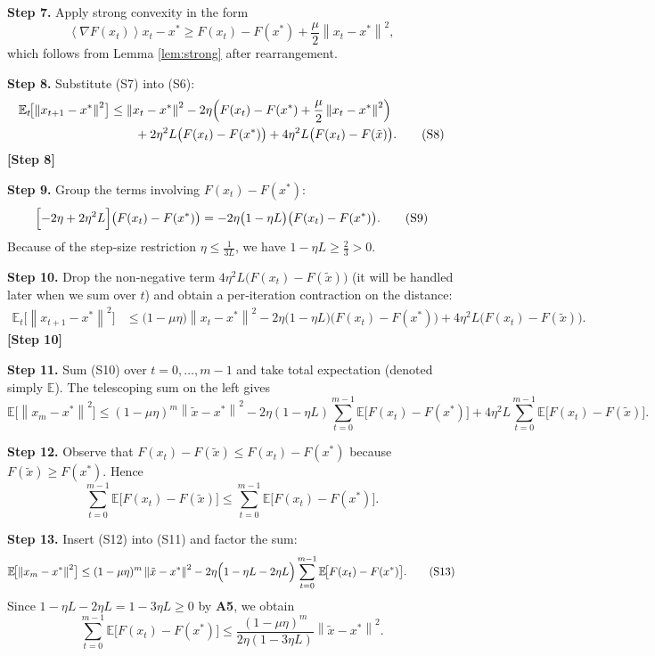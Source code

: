 \documentclass{article}
\newcommand{\E}{\mathbb{E}}
\newcommand{\norm}[1]{\left\|#1\right\|}
\newcommand{\inner}[1]{\left\langle #1 \right\rangle}
\begin{document}
\noindent\textbf{Step 7.} Apply strong convexity in the form
\[
\inner{\nabla F(x_t)}{x_t-x^{*}} \ge F(x_t)-F(x^{*})+\frac{\mu}{2}\norm{x_t-x^{*}}^{2},
\tag{S7}
\]
which follows from Lemma \ref{lem:strong} after rearrangement.

\noindent\textbf{Step 8.} Substitute (S7) into (S6):
\begin{align}
\E_t\!\bigl[\norm{x_{t+1}-x^{*}}^{2}\bigr]
&\le \norm{x_t-x^{*}}^{2}
   -2\eta\Bigl(F(x_t)-F(x^{*})+\frac{\mu}{2}\norm{x_t-x^{*}}^{2}\Bigr) \nonumber\\
&\qquad+2\eta^{2}L\bigl(F(x_t)-F(x^{*})\bigr)
   +4\eta^{2}L\bigl(F(x_t)-F(\tilde{x})\bigr).
\tag{S8}
\end{align}
\textbf{[Step 8]}

\noindent\textbf{Step 9.} Group the terms involving $F(x_t)-F(x^{*})$:
\[
\Bigl[-2\eta+2\eta^{2}L\Bigr]\bigl(F(x_t)-F(x^{*})\bigr)
= -2\eta\bigl(1-\eta L\bigr)\bigl(F(x_t)-F(x^{*})\bigr).
\tag{S9}
\]
Because of the step‑size restriction $\eta\le\frac{1}{3L}$, we have $1-\eta L\ge\frac{2}{3}>0$.

\noindent\textbf{Step 10.} Drop the non‑negative term $4\eta^{2}L\bigl(F(x_t)-F(\tilde{x})\bigr)$ (it will be handled later when we sum over $t$) and obtain a per‑iteration contraction on the distance:
\begin{align}
\E_t\!\bigl[\norm{x_{t+1}-x^{*}}^{2}\bigr]
&\le \bigl(1-\mu\eta\bigr)\norm{x_t-x^{*}}^{2}
   -2\eta\bigl(1-\eta L\bigr)\bigl(F(x_t)-F(x^{*})\bigr)
   +4\eta^{2}L\bigl(F(x_t)-F(\tilde{x})\bigr).
\tag{S10}
\end{align}
\textbf{[Step 10]}

\noindent\textbf{Step 11.} Sum (S10) over $t=0,\dots,m-1$ and take total expectation (denoted simply $\E$).  
The telescoping sum on the left gives
\[
\E\!\bigl[\norm{x_{m}-x^{*}}^{2}\bigr]
\le (1-\mu\eta)^{m}\norm{\tilde{x}-x^{*}}^{2}
   -2\eta(1-\eta L)\sum_{t=0}^{m-1}\E\!\bigl[F(x_t)-F(x^{*})\bigr]
   +4\eta^{2}L\sum_{t=0}^{m-1}\E\!\bigl[F(x_t)-F(\tilde{x})\bigr].
\tag{S11}
\]

\noindent\textbf{Step 12.} Observe that $F(x_t)-F(\tilde{x})\le F(x_t)-F(x^{*})$ because $F(\tilde{x})\ge F(x^{*})$. Hence
\[
\sum_{t=0}^{m-1}\E\!\bigl[F(x_t)-F(\tilde{x})\bigr]
\le \sum_{t=0}^{m-1}\E\!\bigl[F(x_t)-F(x^{*})\bigr].
\tag{S12}
\]

\noindent\textbf{Step 13.} Insert (S12) into (S11) and factor the sum:
\[
\E\!\bigl[\norm{x_{m}-x^{*}}^{2}\bigr]
\le (1-\mu\eta)^{m}\norm{\tilde{x}-x^{*}}^{2}
   -2\eta\Bigl(1-\eta L-2\eta L\Bigr)
    \sum_{t=0}^{m-1}\E\!\bigl[F(x_t)-F(x^{*})\bigr].
\tag{S13}
\]
Since $1-\eta L-2\eta L=1-3\eta L\ge 0$ by \textbf{A5}, we obtain
\[
\sum_{t=0}^{m-1}\E\!\bigl[F(x_t)-F(x^{*})\bigr]
\le \frac{(1-\mu\eta)^{m}}{2\eta(1-3\eta L)}
      \norm{\tilde{x}-x^{*}}^{2}.
\tag{S14}
\]
\end{document}
